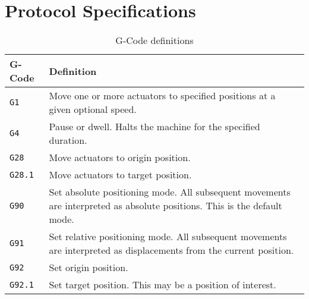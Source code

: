 \section{Protocol Specifications}


\begingroup
\setlength{\tabcolsep}{10pt} %
\renewcommand{\arraystretch}{1.5} %
\begin{table}[h]
    \centering
    \caption{G-Code definitions}
    \label{tab:g-definitions}
    \begin{tabular}{p{}p{}}
    \toprule
    G-Code & Definition \\ \midrule
    \texttt{G1} & Move one or more actuators to specified positions at a given optional speed. \\
    \texttt{G4} & Pause or dwell. Halts the machine for the specified duration. \\
    \texttt{G28} & Move actuators to origin position. \\
    \texttt{G28.1} & Move actuators to target position. \\
    \texttt{G90} & Set absolute positioning mode. All subsequent movements are interpreted as absolute positions. This is the default mode. \\
    \texttt{G91} & Set relative positioning mode. All subsequent movements are interpreted as displacements from the current position. \\
    \texttt{G92} & Set origin position. \\
    \texttt{G92.1} & Set target position. This may be a position of interest. \\ \bottomrule
    \end{tabular}
\end{table}
\endgroup

